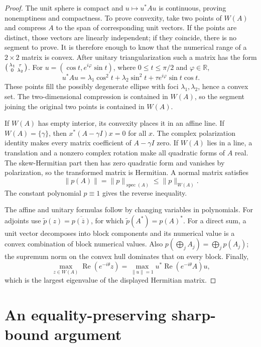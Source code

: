 \documentclass[preprints,article,submit,oneauthor]{Definitions/mdpi}
\numberwithin{equation}{section}
\newcommand{\R}{\mathbb R}
\newcommand{\spec}{\operatorname{spec}}
\newcommand{\Rea}{\operatorname{Re}}
\begin{document}
\begin{proof}
The unit sphere is compact and \(u\mapsto u^*Au\) is continuous, proving
nonemptiness and compactness.  To prove convexity, take two points of \(W(A)\)
and compress \(A\) to the span of corresponding unit vectors.  If the points
are distinct, those vectors are linearly independent; if they coincide, there
is no segment to prove.  It is therefore enough to know that the numerical
range of a \(2\times2\) matrix is convex.  After unitary
triangularization such a matrix has the form
\(
 \begin{psmallmatrix}\lambda_1&\tau\\0&\lambda_2\end{psmallmatrix}
\).
For \(u=(\cos t,e^{i\varphi}\sin t)\), where
\(0\leq t\leq\pi/2\) and \(\varphi\in\R\),
\[
 u^*Au=\lambda_1\cos^2t+\lambda_2\sin^2t
       +\tau e^{i\varphi}\sin t\cos t.
\]
These points fill the possibly degenerate ellipse with foci
\(\lambda_1,\lambda_2\), hence a convex set.  The two-dimensional compression
is contained in \(W(A)\), so the segment joining the original two points is
contained in \(W(A)\).

If \(W(A)\) has empty interior, its convexity places it in an affine line.
If \(W(A)=\{\gamma\}\), then \(x^*(A-\gamma I)x=0\) for all \(x\).  The complex
polarization identity makes every matrix coefficient of \(A-\gamma I\) zero.
If \(W(A)\) lies in a line, a translation and a nonzero complex rotation make
all quadratic forms of \(A\) real.  The skew-Hermitian part then has zero
quadratic form and vanishes by polarization, so the transformed matrix is
Hermitian.  A normal matrix satisfies
\[
 \|p(A)\|=\|p\|_{\spec(A)}\leq\|p\|_{W(A)}.
\]
The constant polynomial \(p\equiv1\) gives the reverse inequality.

The affine and unitary formulas follow by changing variables in polynomials.
For adjoints use \(\widetilde p(z)=\overline{p(\overline z)}\), for which
\(\widetilde p(A^*)=p(A)^*\).  For a direct sum, a unit vector decomposes into block
components and its numerical value is a convex combination of block numerical
values.  Also
\(p(\bigoplus_jA_j)=\bigoplus_jp(A_j)\); the supremum norm on the convex hull
dominates that on every block.  Finally,
\[
 \max_{z\in W(A)}\Rea(e^{-i\theta}z)
 =\max_{\|u\|=1}u^*\Rea(e^{-i\theta}A)u,
\]
which is the largest eigenvalue of the displayed Hermitian matrix.
\end{proof}

\section{An equality-preserving sharp-bound argument}
\end{document}
